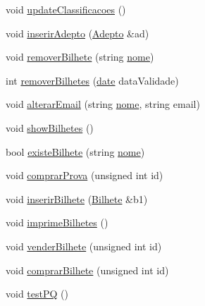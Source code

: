 \begin{DoxyCompactItemize}
\item 
void \hyperlink{class_campeonato_a27e5a93ec804bcc6e468471a7142f96a}{update\+Classificacoes} ()
\item 
void \hyperlink{class_campeonato_a1426a2ff63ad60a18ae5bb9e1d5e012c}{inserir\+Adepto} (\hyperlink{class_adepto}{Adepto} \&ad)
\item 
void \hyperlink{class_campeonato_aa6a6700d46b88fabe3a1b0fb34f9a94f}{remover\+Bilhete} (string \hyperlink{class_campeonato_a670b0857b7a8bc3c5dbf0f927ee192fe}{nome})
\item 
int \hyperlink{class_campeonato_ae790ca54160b7aad195cb6ac00911ab8}{remover\+Bilhetes} (\hyperlink{structdate}{date} data\+Validade)
\item 
void \hyperlink{class_campeonato_ac2e4f10063a7eab5db2a2c26c1b775eb}{alterar\+Email} (string \hyperlink{class_campeonato_a670b0857b7a8bc3c5dbf0f927ee192fe}{nome}, string email)
\item 
void \hyperlink{class_campeonato_adeeb564f515b80a5d95c4c4dc969ed91}{show\+Bilhetes} ()
\item 
bool \hyperlink{class_campeonato_a631525832cf345606d7091f1fec762c8}{existe\+Bilhete} (string \hyperlink{class_campeonato_a670b0857b7a8bc3c5dbf0f927ee192fe}{nome})
\item 
void \hyperlink{class_campeonato_a0818c1aeee1672cd966853b485f6e2ff}{comprar\+Prova} (unsigned int id)
\item 
void \hyperlink{class_campeonato_a2bff2dfc2a54af52356a6a48bea43d4b}{inserir\+Bilhete} (\hyperlink{class_bilhete}{Bilhete} \&b1)
\item 
void \hyperlink{class_campeonato_a304f842c49f1dc4d6a12c56ef16fc0da}{imprime\+Bilhetes} ()
\item 
void \hyperlink{class_campeonato_aec90a0697ae3f76d05bb0cf938e31f82}{vender\+Bilhete} (unsigned int id)
\item 
void \hyperlink{class_campeonato_a99d8c2f95efb5ac19e3b0d5764bffaa3}{comprar\+Bilhete} (unsigned int id)
\item 
void \hyperlink{class_campeonato_a8db02bd1c7ba93770064d1210a343d72}{test\+P\+Q} ()
\end{DoxyCompactItemize}
